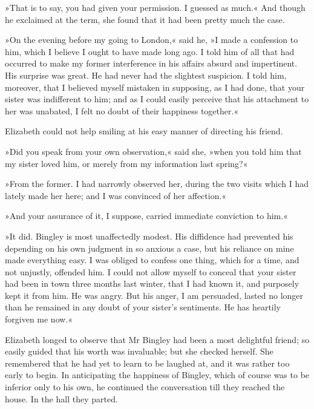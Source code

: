 »That is to say, you had given your permission. I guessed as much.« And though he exclaimed at the term, she found that it had been pretty much the case.

»On the evening before my going to London,« said he, »I made a confession to him, which I believe I ought to have made long ago. I told him of all that had occurred to make my former interference in his affairs absurd and impertinent. His surprise was great. He had never had the slightest suspicion. I told him, moreover, that I believed myself mistaken in supposing, as I had done, that your sister was indifferent to him; and as I could easily perceive that his attachment to her was unabated, I felt no doubt of their happiness together.«

Elizabeth could not help smiling at his easy manner of directing his friend.

»Did you speak from your own observation,« said she, »when you told him that my sister loved him, or merely from my information last spring?«

»From the former. I had narrowly observed her, during the two visits which I had lately made her here; and I was convinced of her affection.«

»And your assurance of it, I suppose, carried immediate conviction to him.«

»It did. Bingley is most unaffectedly modest. His diffidence had prevented his depending on his own judgment in so anxious a case, but his reliance on mine made everything easy. I was obliged to confess one thing, which for a time, and not unjustly, offended him. I could not allow myself to conceal that your sister had been in town three months last winter, that I had known it, and purposely kept it from him. He was angry. But his anger, I am persuaded, lasted no longer than he remained in any doubt of your sister's sentiments. He has heartily forgiven me now.«

Elizabeth longed to observe that Mr Bingley had been a most delightful friend; so easily guided that his worth was invaluable; but she checked herself. She remembered that he had yet to learn to be laughed at, and it was rather too early to begin. In anticipating the happiness of Bingley, which of course was to be inferior only to his own, he continued the conversation till they reached the house. In the hall they parted.